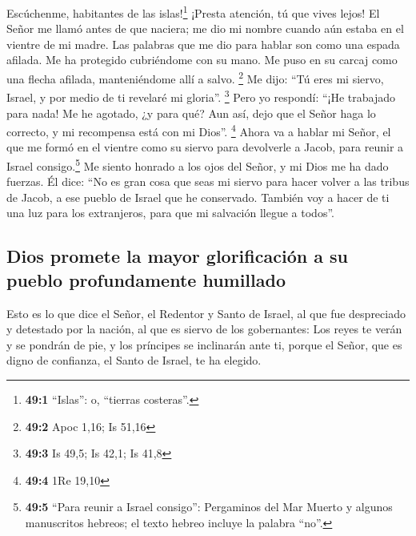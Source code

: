  Escúchenme, habitantes de las islas!\footnote{\textbf{49:1}
  ``Islas'': o, ``tierras costeras''.} ¡Presta atención, tú que vives
lejos! El Señor me llamó antes de que naciera; me dio mi nombre cuando
aún estaba en el vientre de mi madre.  Las palabras que me
dio para hablar son como una espada afilada. Me ha protegido cubriéndome
con su mano. Me puso en su carcaj como una flecha afilada, manteniéndome
allí a salvo. \footnote{\textbf{49:2} Apoc 1,16; Is 51,16}
 Me dijo: ``Tú eres mi siervo, Israel, y por medio de ti
revelaré mi gloria''. \footnote{\textbf{49:3} Is 49,5; Is 42,1; Is 41,8}
 Pero yo respondí: ``¡He trabajado para nada! Me he
agotado, ¿y para qué? Aun así, dejo que el Señor haga lo correcto, y mi
recompensa está con mi Dios''. \footnote{\textbf{49:4} 1Re 19,10}
 Ahora va a hablar mi Señor, el que me formó en el vientre
como su siervo para devolverle a Jacob, para reunir a Israel
consigo.\footnote{\textbf{49:5} ``Para reunir a Israel consigo'':
  Pergaminos del Mar Muerto y algunos manuscritos hebreos; el texto
  hebreo incluye la palabra ``no''.} Me siento honrado a los ojos del
Señor, y mi Dios me ha dado fuerzas.  Él dice: ``No es
gran cosa que seas mi siervo para hacer volver a las tribus de Jacob, a
ese pueblo de Israel que he conservado. También voy a hacer de ti una
luz para los extranjeros, para que mi salvación llegue a todos''.

\hypertarget{dios-promete-la-mayor-glorificaciuxf3n-a-su-pueblo-profundamente-humillado}{%
\subsection{Dios promete la mayor glorificación a su pueblo
profundamente
humillado}\label{dios-promete-la-mayor-glorificaciuxf3n-a-su-pueblo-profundamente-humillado}}

 Esto es lo que dice el Señor, el Redentor y Santo de
Israel, al que fue despreciado y detestado por la nación, al que es
siervo de los gobernantes: Los reyes te verán y se pondrán de pie, y los
príncipes se inclinarán ante ti, porque el Señor, que es digno de
confianza, el Santo de Israel, te ha elegido.

